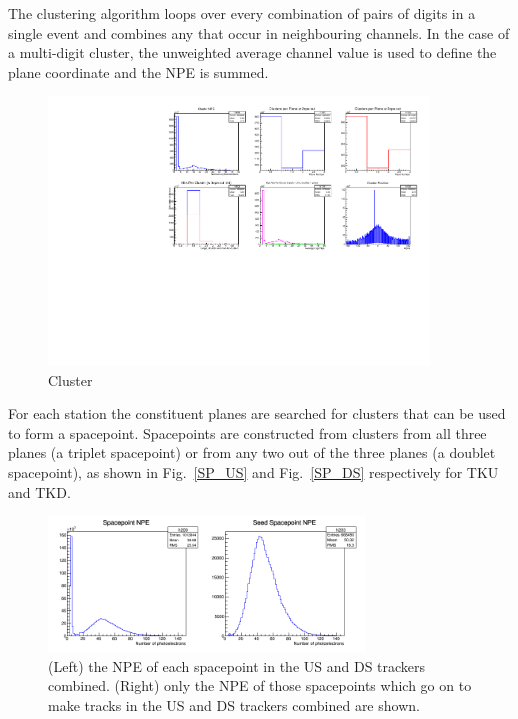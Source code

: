 The clustering algorithm loops over every combination of pairs of digits in a single event and combines any that occur in neighbouring channels. In the case of a multi-digit cluster, the unweighted average channel value is used to define the plane coordinate and the NPE is summed.

\begin{figure}[!ht]
\begin{center}
\includegraphics[width=0.9\textwidth,keepaspectratio=true,]{Clusters.pdf}
\end{center}
\caption{Cluster}
\label{Figure:Clusters}
\end{figure}

For each station the constituent planes are searched for clusters that can be used to form a spacepoint.
Spacepoints are constructed from clusters from all three planes (a triplet spacepoint) or from any two out of the three planes (a doublet spacepoint), as shown in Fig.~\ref{SP_US} and Fig.~\ref{SP_DS} respectively for TKU and TKD.

\begin{figure}[!ht]
\begin{center}
\includegraphics[width=0.75\textwidth,keepaspectratio=true,]{SPSeeds10314.png}
\end{center}
\caption{(Left) the NPE of each spacepoint in the US and DS trackers combined. (Right) only the NPE of those spacepoints which go on to make tracks in the US and DS trackers combined are shown.}
\label{Figure:SPSeeds_10314}
\end{figure}



